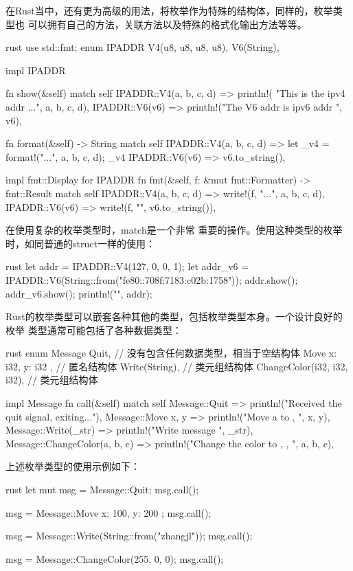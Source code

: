 在Rust当中，还有更为高级的用法，将枚举作为特殊的结构体，同样的，枚举类型也
可以拥有自己的方法，关联方法以及特殊的格式化输出方法等等。
\begin{code-block}{rust}
use std::fmt;
enum IPADDR {
    V4(u8, u8, u8, u8),
    V6(String),
}

impl IPADDR {
    fn show(&self) {
        match self {
            IPADDR::V4(a, b, c, d) => println!(
                "This is the ipv4 addr {}.{}.{}.{}", a, b, c, d),
            IPADDR::V6(v6) => println!("The V6 addr is ipv6 addr {}", v6),
        }
    }

    fn format(&self) -> String {
        match self {
            IPADDR::V4(a, b, c, d) => {
                let _v4 = format!("{}.{}.{}.{}", a, b, c, d);
                _v4
            }
            IPADDR::V6(v6) => v6.to_string(),
        }
    }
}

impl fmt::Display for IPADDR {
    fn fmt(&self, f: &mut fmt::Formatter) -> fmt::Result {
        match self {
            IPADDR::V4(a, b, c, d) => write!(f, "{}.{}.{}.{}", a, b, c, d),
            IPADDR::V6(v6) => write!(f, "{}", v6.to_string()),
        }
    }
}
\end{code-block}
在使用复杂的枚举类型时，match是一个非常
重要的操作。使用这种类型的枚举时，如同普通的struct一样的使用：
\begin{code-block}{rust}
let addr = IPADDR::V4(127, 0, 0, 1);
let addr_v6 = IPADDR::V6(String::from("fe80::708f:7183:c02b:1758"));
addr.show();
addr_v6.show();
println!("{}", addr);
\end{code-block}

Rust的枚举类型可以嵌套各种其他的类型，包括枚举类型本身。一个设计良好的枚举
类型通常可能包括了各种数据类型：
\begin{code-block}{rust}
enum Message {
    Quit, // 没有包含任何数据类型，相当于空结构体
    Move { x: i32, y: i32 }, // 匿名结构体
    Write(String), // 类元组结构体
    ChangeColor(i32, i32, i32), // 类元组结构体
}

impl Message {
    fn call(&self) {
        match self {
            Message::Quit => println!("Received the quit signal, exiting..."),
            Message::Move { x, y } => println!("Move a to {}, {}", x, y),
            Message::Write(_str) => println!("Write message {}", _str),
            Message::ChangeColor(a, b, c) =>
                println!("Change the color to {}, {}, {}", a, b, c),
        }
    }
}
\end{code-block}
上述枚举类型的使用示例如下：
\begin{code-block}{rust}
let mut msg = Message::Quit;
msg.call();

msg = Message::Move { x: 100, y: 200 };
msg.call();

msg = Message::Write(String::from("zhangjl"));
msg.call();

msg = Message::ChangeColor(255, 0, 0);
msg.call();
\end{code-block}

